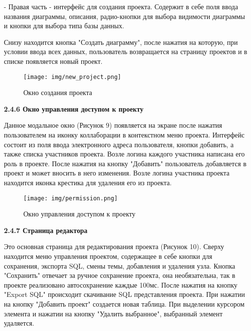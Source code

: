     - Правая часть - интерфейс для создания проекта. Содержит в себе поля ввода названия диаграммы, описания, радио-кнопки для выбора видимости диаграммы и кнопки для выбора типа базы данных.
    
Снизу находится кнопка "Создать диаграмму", после нажатия на которую, при условии ввода всех данных, пользователь возвращается на страницу проектов и в списке появляется новый проект.

\renewcommand{\figurename}{Рисунок}
\begin{figure}[htbp]
    \centering %
    \texttt{[image: img/new\_project.png]}
    \caption{Окно создания проекта}
    \label{fig:analyze} %
\end{figure}

\newpage

\textbf{2.4.6 Окно управления доступом к проекту}

Данное модальное окно (Рисунок 9) появляется на экране после нажатия пользователем на иконку коллаборации в контекстном меню проекта. Интерфейс состоит из поля ввода электронного адреса пользователя, кнопки добавить, а также списка участников проекта. Возле логина каждого участника написана его роль в проекте. После нажатия на кнопку "Добавить" пользователь добавляется в проект и может вносить в него изменения. Возле логина участника проекта находится иконка крестика для удаления его из проекта.
    
\renewcommand{\figurename}{Рисунок}
\begin{figure}[htbp]
    \centering %
    \texttt{[image: img/permission.png]}
    \caption{Окно управления доступом к проекту}
    \label{fig:analyze} %
\end{figure}

\newpage

\textbf{2.4.7 Страница редактора}

Это основная страница для редактирования проекта (Рисунок 10). Сверху находится меню управления проектом, содержащее в себе кнопки для сохранения, экспорта SQL, смены темы, добавления и удаления узла. Кнопка "Сохранить" отвечает за ручное сохранение проекта, она необязательна, так в проекте реализовано автосохранение каждые 100мс. После нажатия на кнопку "Export SQL" происходит скачивание SQL представления проекта. При нажатии на кнопку "Добавить проект" создается новая таблица. При выделении курсором элемента и нажатии на кнопку "Удалить выбранное", выбранный элемент удаляется.

